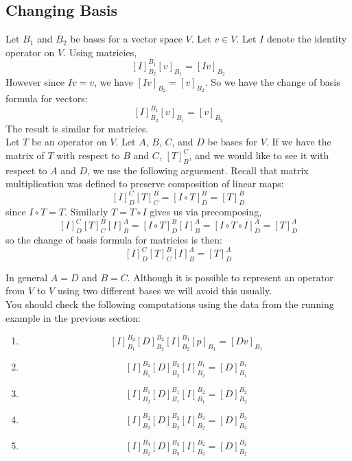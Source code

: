 \documentclass{article}
\theoremstyle{problemstyle}
\begin{document}
\subsection*{Changing Basis}


Let $B_1$ and $B_2$ be bases for a vector space $V$. Let $v \in V$. Let $I$ denote the identity operator on $V$. Using matricies, $$[I]_{B_2}^{B_1}[v]_{B_1} = [Iv]_{B_2}$$ However since $Iv = v$,  we have $[Iv]_{B_2} = [v]_{B_2}$. So we have the change of basis formula for vectors: $$[I]_{B_2}^{B_1}[v]_{B_1} = [v]_{B_2}$$ The result is similar for matricies.\\

Let $T$ be an operator on $V$. Let $A$, $B$, $C$, and $D$ be bases for $V$. If we have the matrix of $T$ with respect to $B$ and $C$, $[T]_{B}^{C}$, and we would like to see it with respect to $A$ and $D$, we use the following arguement. Recall that matrix multiplication was defined to preserve composition of linear maps:  $$[I]_{D}^{C}[T]_{C}^{B} = [I\circ T]^{B}_{D} = [T]^{B}_{D}$$ since $I \circ T = T$. Similarly $T = T \circ I$ gives us via precomposing, $$[I]_{D}^{C}[T]_{C}^{B}[I]^{A}_{B} = [I \circ T]^{B}_{D}[I]^{A}_{B} = [I \circ T \circ I]^{A}_{D} = [T]^{A}_{D}$$ so the change of basis formula for matricies is then: $$[I]_{D}^{C}[T]_{C}^{B}[I]^{A}_{B} = [T]^{A}_{D}$$

In general $A = D$ and $B = C$. Although it is possible to represent an operator from $V$ to $V$ using two different bases we will avoid this usually.\\  

You should check the following computations using the data from the running example in the previous section:
\begin{enumerate}
\item $$[I]_{B_1}^{B_2}[D]_{B_2}^{B_2}[I]^{B_1}_{B_2}[p]_{B_1} = [Dv]_{B_1}$$
\item $$[I]_{B_1}^{B_2}[D]_{B_2}^{B_2}[I]^{B_1}_{B_2} = [D]^{B_1}_{B_1}$$
\item $$[I]_{B_2}^{B_1}[D]_{B_1}^{B_1}[I]^{B_2}_{B_1} = [D]^{B_2}_{B_2}$$
\item $$[I]_{B_3}^{B_2}[D]_{B_2}^{B_2}[I]^{B_3}_{B_2} = [D]^{B_3}_{B_3}$$
\item $$[I]_{B_2}^{B_3}[D]_{B_3}^{B_3}[I]^{B_2}_{B_3} = [D]^{B_2}_{B_2}$$
\end{enumerate}
\end{document}
